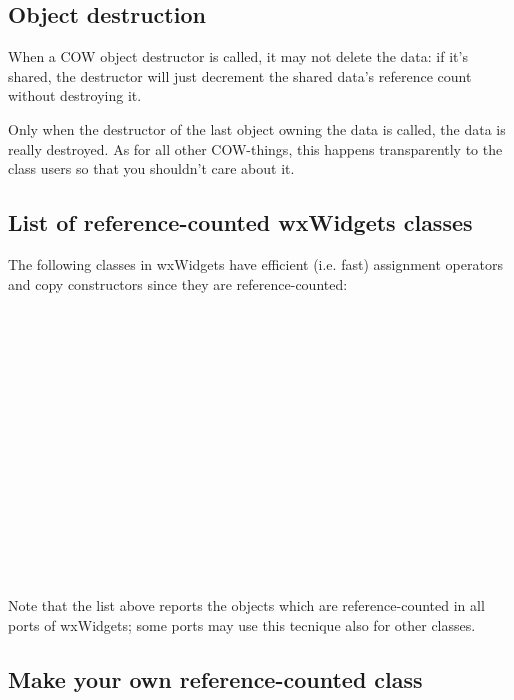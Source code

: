 \subsection{Object destruction}\label{refcountdestruct}

When a COW object destructor is called, it may not delete the data: if it's shared,
the destructor will just decrement the shared data's reference count without destroying it.

Only when the destructor of the last object owning the data is called, the data is really
destroyed. As for all other COW-things, this happens transparently to the class users so
that you shouldn't care about it.


\subsection{List of reference-counted wxWidgets classes}\label{refcountlist}

The following classes in wxWidgets have efficient (i.e. fast) assignment operators
and copy constructors since they are reference-counted:

\\
\\
\\
\\
\\
\\
\\
\\
\\
\\
\\
\\
\\
\\

Note that the list above reports the objects which are reference-counted in all ports of
wxWidgets; some ports may use this tecnique also for other classes.
\subsection{Make your own reference-counted class}\label{wxobjectoverview}


